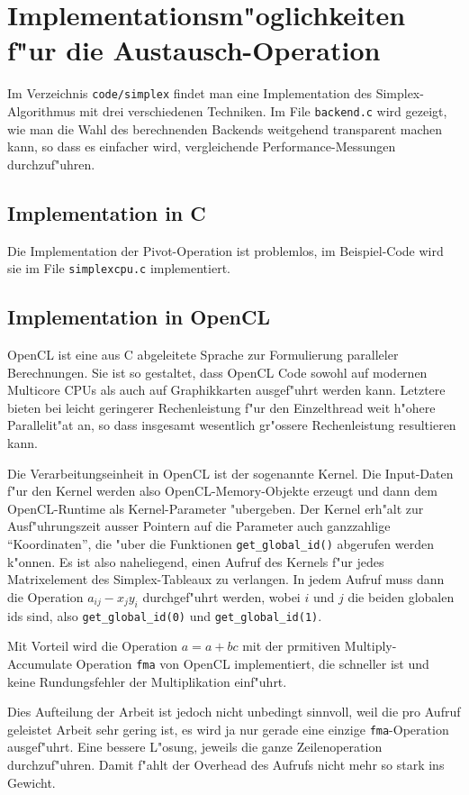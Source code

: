 \section{Implementationsm"oglichkeiten f"ur die Austausch-Operation}
Im Verzeichnis {\tt code/simplex} findet man eine Implementation
des Simplex-Algorithmus mit drei verschiedenen Techniken.
Im File {\tt backend.c} wird gezeigt, wie man die Wahl des berechnenden
Backends weitgehend transparent machen kann, so dass es einfacher wird,
vergleichende Performance-Messungen durchzuf"uhren.

\subsection{Implementation in C}
Die Implementation der Pivot-Operation ist problemlos, im Beispiel-Code
wird sie im File {\tt simplexcpu.c} implementiert.

\subsection{Implementation in OpenCL}
OpenCL ist eine aus C abgeleitete Sprache zur Formulierung paralleler
Berechnungen. Sie ist so gestaltet, dass OpenCL Code sowohl auf 
modernen Multicore CPUs als auch auf Graphikkarten ausgef"uhrt
werden kann. Letztere bieten bei leicht geringerer
Rechenleistung f"ur den Einzelthread weit h"ohere Parallelit"at an,
so dass insgesamt wesentlich gr"ossere Rechenleistung resultieren kann.

Die Verarbeitungseinheit in OpenCL ist der sogenannte Kernel.
Die Input-Daten f"ur den Kernel werden also OpenCL-Memory-Objekte
erzeugt und dann dem OpenCL-Runtime als Kernel-Parameter "ubergeben.
Der Kernel erh"alt zur Ausf"uhrungszeit ausser Pointern auf die 
Parameter auch ganzzahlige ``Koordinaten'', die "uber die
Funktionen \verb+get_global_id()+ abgerufen werden k"onnen.
Es ist also naheliegend, einen Aufruf des Kernels f"ur jedes
Matrixelement des Simplex-Tableaux zu verlangen. In jedem
Aufruf muss dann die Operation $a_{ij}-x_jy_i$
durchgef"uhrt werden, wobei $i$ und $j$ die beiden
globalen ids sind, also
\verb+get_global_id(0)+ und
\verb+get_global_id(1)+.

Mit Vorteil wird die Operation $a=a+bc$ mit der prmitiven Multiply-Accumulate
Operation {\tt fma} von OpenCL implementiert, die schneller ist und
keine Rundungsfehler der Multiplikation einf"uhrt.

Dies Aufteilung der Arbeit ist jedoch nicht unbedingt sinnvoll,
weil die pro Aufruf geleistet Arbeit sehr gering ist, es wird ja nur
gerade eine einzige {\tt fma}-Operation ausgef"uhrt.
Eine bessere L"osung, jeweils die ganze Zeilenoperation durchzuf"uhren.
Damit f"ahlt der Overhead des Aufrufs nicht mehr so stark ins Gewicht.

